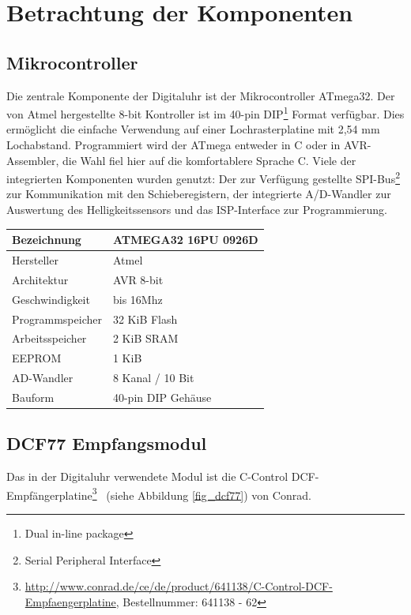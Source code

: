 \section{Betrachtung der Komponenten}
\subsection{Mikrocontroller}
Die zentrale Komponente der Digitaluhr ist der Mikrocontroller ATmega32. Der von Atmel hergestellte 8-bit Kontroller ist im 40-pin DIP\footnote{Dual in-line package} Format verfügbar. Dies ermöglicht die einfache Verwendung auf einer Lochrasterplatine mit 2,54 mm Lochabstand. Programmiert wird der ATmega entweder in C oder in AVR-Assembler, die Wahl fiel hier auf die komfortablere Sprache C.
Viele der integrierten Komponenten wurden genutzt: Der zur Verfügung gestellte SPI-Bus\footnote{Serial Peripheral Interface} zur Kommunikation mit den Schieberegistern, der integrierte A/D-Wandler zur Auswertung des Helligkeitssensors und das ISP-Interface zur Programmierung.

\begin{center}
 \renewcommand{\arraystretch}{1.2}
 \begin{tabular}{||l | l||}
  \hline\hline
  Bezeichnung&ATMEGA32 16PU 0926D\\\hline
  Hersteller&Atmel\\\hline
  Architektur&AVR 8-bit \\\hline
  Geschwindigkeit&bis 16Mhz \\\hline
  Programmspeicher&32 KiB Flash \\\hline
  Arbeitsspeicher&2 KiB SRAM \\\hline
  EEPROM&1 KiB \\\hline
  AD-Wandler&8 Kanal / 10 Bit \\\hline
  Bauform&40-pin DIP Gehäuse \\
  \hline\hline    
\end{tabular}
\end{center}



\subsection{DCF77 Empfangsmodul}\label{sec_dcf77modul}
Das in der Digitaluhr verwendete Modul ist die \glqq C-Control DCF-Empfängerplatine\grqq\footnote{\url{http://www.conrad.de/ce/de/product/641138/C-Control-DCF-Empfaengerplatine}, Bestellnummer: 641138 - 62}~ (siehe Abbildung \ref{fig_dcf77}) von Conrad.

